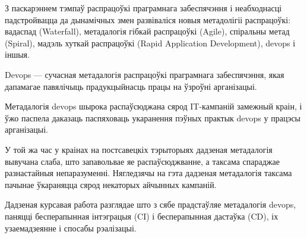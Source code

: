 \sectionWithoutNumber{\prefacename}
З паскарэннем тэмпаў распрацоўкі праграмнага забеспячэння і
неабходнасці падстройвацца да дынамічных змен
развіваліся новыя метадолігіі распрацоўкі: вадаспад (Waterfall),
метадалогія гібкай распрацоўкі (Agile), спіральны метад (Spiral),
мадэль хуткай распрацоўкі (Rapid Application Development), devops і іншыя.


Devops — сучасная метадалогія распрацоўкі праграмнага забеспячэння, якая
дапамагае павялічыць прадукцыйнасць працы на ўзроўні арганізацыі.

Метадалогія devops шырока распаўсюджана сярод IT-кампаній замежный краін,
і ўжо паспела даказаць паспяховаць укаранення пэўных практык devops
у працэсы арганізацыі.

У той жа час у краінах на постсавецкіх тэрыторыях дадзеная метадалогія
вывучана слаба, што запавольвае яе распаўсюджванне, а таксама спараджае
разнастайныя непаразуменні.
Нягледзячы на гэта дадзеная метадалогія таксама пачынае ўкараняцца сярод
некаторых айчынных кампаній.

Дадзеная курсавая работа разглядае што з сябе прадстаўляе метадалогія
devops, паняцці бесперапынная інтэграцыя (CI) і бесперапынная дастаўка (CD),
іх узаемадзеянне і спосабы рэалізацыі.

\clearpage
